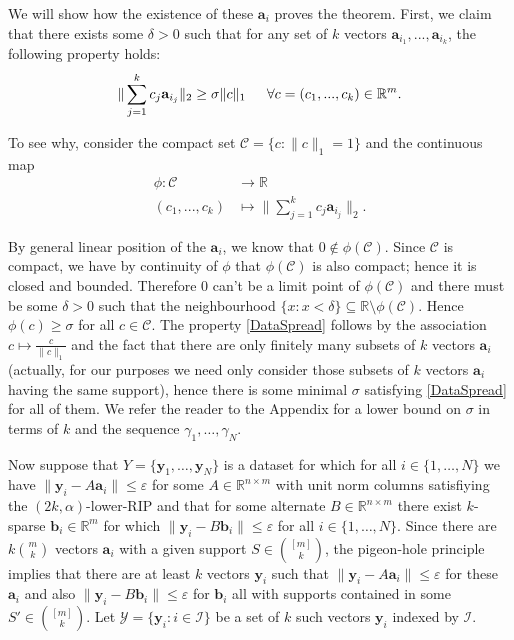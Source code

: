 \documentclass[journal,onecolumn]{IEEEtran}
\begin{document}
We will show how the existence of these $\mathbf{a}_i$ proves the theorem. First, we claim that there exists some $\delta > 0$ such that for any set of $k$ vectors $\mathbf{a}_{i_1}, ..., \mathbf{a}_{i_k}$, the following property holds:
\begin{align}\label{DataSpread}
\|\sum_{j = 1}^k c_j \mathbf{a}_{i_j}\|_2 \geq \sigma \|c\|_1 \indent \forall c = (c_1, ..., c_k) \in \mathbb{R}^m.
\end{align}

To see why, consider the compact set $\mathcal{C} = \{c: \|c\|_1 = 1\}$ and the continuous map
\begin{align*}
\phi: \mathcal{C} &\to \mathbb{R} \\
(c_1, ..., c_k) &\mapsto \|\sum_{j = 1}^k c_j \mathbf{a}_{i_j}\|_2.
\end{align*}

By general linear position of the $\mathbf{a}_i$, we know that $0 \notin \phi(\mathcal{C})$. Since $\mathcal{C}$ is compact, we have by continuity of $\phi$ that $\phi(\mathcal{C})$ is also compact; hence it is closed and bounded. Therefore $0$ can't be a limit point of $\phi(\mathcal{C})$ and there must be some $\delta > 0$ such that the neighbourhood $\{x: x < \delta\} \subseteq \mathbb{R} \setminus \phi(\mathcal{C})$. Hence $\phi(c) \geq \sigma$ for all $c \in \mathcal{C}$. The property \eqref{DataSpread} follows by the association $c \mapsto \frac{c}{\|c\|_1}$ and the fact that there are only finitely many subsets of $k$ vectors $\mathbf{a}_i$ (actually, for our purposes we need only consider those subsets of $k$ vectors $\mathbf{a}_i$ having the same support), hence there is some minimal $\sigma$ satisfying \eqref{DataSpread} for all of them. We refer the reader to the Appendix for a lower bound on $\sigma$ in terms of $k$ and the sequence $\gamma_1, \ldots, \gamma_N$.

Now suppose that $Y = \{\mathbf{y}_1, \ldots, \mathbf{y}_N\}$ is a dataset for which for all $i \in \{1, \ldots, N\}$ we have $\|\mathbf{y}_i - A\mathbf{a}_i\| \leq \varepsilon$ for some $A \in \mathbb{R}^{n \times m}$ with unit norm columns satisfiying the $(2k,\alpha)$-lower-RIP and that for some alternate $B \in \mathbb{R}^{n \times m}$ there exist $k$-sparse $\mathbf{b}_i \in \mathbb{R}^m$ for which $\|\mathbf{y}_i - B\mathbf{b}_i\| \leq \varepsilon$ for all $i \in \{1, \ldots, N\}$. Since there are $k{m \choose k}$ vectors $\mathbf{a}_i$ with a given support $S \in {[m] \choose k}$, the pigeon-hole principle implies that there are at least $k$ vectors $\mathbf{y}_i$ such that $\|\mathbf{y}_i - A\mathbf{a}_i\| \leq \varepsilon$ for these $\mathbf{a}_i$ and also $\|\mathbf{y}_i - B\mathbf{b}_i\| \leq \varepsilon$ for $\mathbf{b}_i$ all with supports contained in some $S' \in {[m] \choose k}$. Let $\mathcal{Y} = \{\mathbf{y}_i: i \in \mathcal{I}\}$ be a set of $k$ such vectors $\mathbf{y}_i$ indexed by $\mathcal{I}$.
\end{document}
